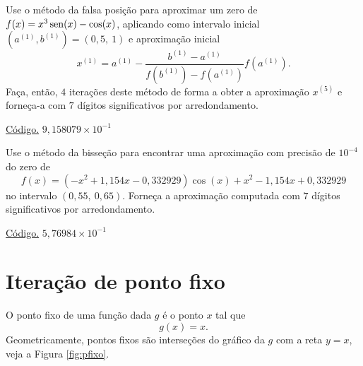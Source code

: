 \begin{exer}\label{exer:bis_1}
  Use o método da falsa posição para aproximar um zero de $f(x)=x^3\operatorname{sen}(x)-\cos(x)$, aplicando como intervalo inicial $(a^{(1)}, b^{(1)}) = (0,5, ~1)$ e aproximação inicial
  \begin{equation}
    x^{(1)} = a^{(1)} - \frac{b^{(1)}-a^{(1)}}{f(b^{(1)})-f(a^{(1)})}f(a^{(1)}).
  \end{equation}
Faça, então, $4$ iterações deste método de forma a obter a aproximação $x^{(5)}$ e forneça-a com $7$ dígitos significativos por arredondamento.
\end{exer}
\begin{resp}
    \ifisoctave 
  \href{https://github.com/phkonzen/notas/blob/master/src/MatematicaNumerica/cap_eq1d/dados/exer_falsapos_1/exer_falsapos_1.m}{Código.} 
  \fi
  $9,158079\times 10^{-1}$
\end{resp}

\begin{exer}\label{exer:bis_multpar}
  Use o método da bisseção para encontrar uma aproximação com precisão de $10^{-4}$ do zero de
  \begin{equation}
    f(x) = (-x^2+1,154x-0,332929)\cos(x) + x^2 - 1,154x + 0,332929
  \end{equation}
no intervalo $(0,55, ~0,65)$. Forneça a aproximação computada com $7$ dígitos significativos por arredondamento.
\end{exer}
\begin{resp}
    \ifisoctave 
  \href{https://github.com/phkonzen/notas/blob/master/src/MatematicaNumerica/cap_eq1d/dados/exer_falsapos_multpar/exer_falsapos_multpar.m}{Código.} 
  \fi
  $5,76984\times 10^{-1}$
\end{resp}

\section{Iteração de ponto fixo}\label{cap_eq1d_pfixo}

O ponto fixo de uma função dada $g$ é o ponto $x$ tal que
\begin{equation}
  g(x) = x.
\end{equation}
Geometricamente, pontos fixos são interseções do gráfico da $g$ com a reta $y=x$, veja a Figura \ref{fig:pfixo}.

